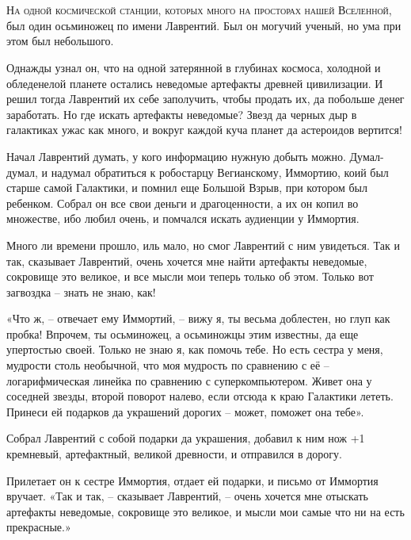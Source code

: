 \documentclass[ebook,oneside,final,openright]{memoir}
\begin{document}
\chapter{}
 \lettrine{Н}{а одной космической станции, которых много на просторах нашей Вселенной,} был один осьминожец по имени Лаврентий. Был он могучий ученый, но ума при этом был небольшого.\par
\par
Однажды узнал он, что на одной затерянной в глубинах космоса, холодной и обледенелой планете остались неведомые артефакты древней цивилизации. И решил тогда Лаврентий их себе заполучить, чтобы продать их, да побольше денег заработать. Но где искать артефакты неведомые? Звезд да черных дыр в галактиках ужас как много, и вокруг каждой куча планет да астероидов вертится!\par
\par
Начал Лаврентий думать, у кого информацию нужную добыть можно. Думал-думал, и надумал обратиться к робостарцу Вегианскому, Иммортию, коий был старше самой Галактики, и помнил еще Большой Взрыв, при котором был ребенком. Собрал он все свои деньги и драгоценности, а их он копил во множестве, ибо любил очень, и помчался искать аудиенции у Иммортия.\par
\par
Много ли времени прошло, иль мало, но смог Лаврентий с ним увидеться. Так и так, сказывает Лаврентий, очень хочется мне найти артефакты неведомые, сокровище это великое, и все мысли мои теперь только об этом. Только вот загвоздка – знать не знаю, как!\par
\par
«Что ж, – отвечает ему Иммортий, – вижу я, ты весьма доблестен, но глуп как пробка! Впрочем, ты осьминожец, а осьминожцы этим известны, да еще упертостью своей. Только не знаю я, как помочь тебе. Но есть сестра у меня, мудрости столь необычной, что моя мудрость по сравнению с её – логарифмическая линейка по сравнению с суперкомпьютером. Живет она у соседней звезды, второй поворот налево, если отсюда к краю Галактики лететь. Принеси ей подарков да украшений дорогих – может, поможет она тебе».\par
\par
Собрал Лаврентий с собой подарки да украшения, добавил к ним нож +1 кремневый, артефактный, великой древности, и отправился в дорогу.\par
\par
Прилетает он к сестре Иммортия, отдает ей подарки, и письмо от Иммортия вручает. «Так и так, – сказывает Лаврентий, – очень хочется мне отыскать артефакты неведомые, сокровище это великое, и мысли мои самые что ни на есть прекрасные.»\par
\end{document}

